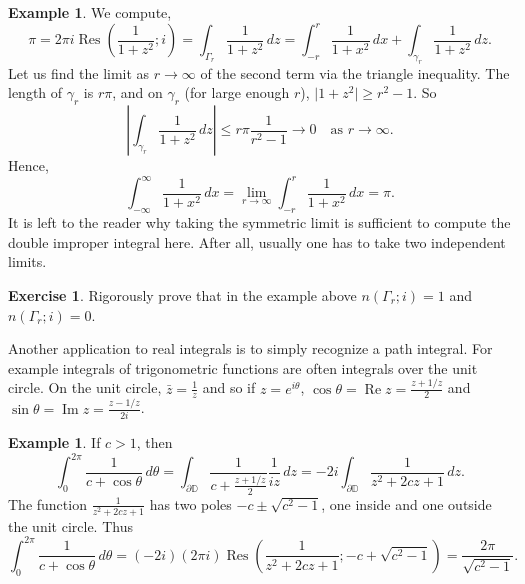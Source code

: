 \documentclass[12pt,openany]{book}
\renewcommand{\Re}{\operatorname{Re}}
\renewcommand{\Im}{\operatorname{Im}}
\newcommand{\sabs}[1]{\lvert {#1} \rvert}
\newcommand{\abs}[1]{\left\lvert {#1} \right\rvert}
\newcommand{\D}{{\mathbb{D}}}
\theoremstyle{plain}
\theoremstyle{remark}
\theoremstyle{definition}
\newenvironment{exbox}{%
    \def\FrameCommand{\vrule width 1pt \relax\hspace {10pt}}%
    \MakeFramed {\advance \hsize -\width \FrameRestore }%
}{%
    \endMakeFramed
}
\theoremstyle{exercise}
\newtheorem{exercise}{Exercise}[section]
\theoremstyle{example}
\newtheorem{example}[thm]{Example}
\begin{document}
\begin{example}
We compute,
\begin{equation*}
\pi 
=
2 \pi i \operatorname{Res}\left(\frac{1}{1+z^2};i\right) =
\int_{\Gamma_r} \frac{1}{1+z^2} \, dz
=
\int_{-r}^r \frac{1}{1+x^2} \, dx
+
\int_{\gamma_r} \frac{1}{1+z^2} \, dz .
\end{equation*}
Let us find the limit as $r \to \infty$ of the second term
via the triangle inequality.  The length of $\gamma_r$ is $r\pi$,
and on $\gamma_r$ (for large enough $r$),
$\sabs{1+z^2} \geq r^2-1$.  So
\begin{equation*}
\abs{
\int_{\gamma_r} \frac{1}{1+z^2} \, dz 
}
\leq
r \pi \frac{1}{r^2-1} \to 0 \quad \text{as } r \to \infty .
\end{equation*}
Hence,
\begin{equation*}
\int_{-\infty}^\infty
\frac{1}{1+x^2} \, dx
=
\lim_{r\to \infty} \int_{-r}^r 
\frac{1}{1+x^2} \, dx
= \pi .
\end{equation*}
It is left to the reader why taking the symmetric limit is sufficient to
compute the double improper integral here.  After all, usually one has to
take two independent limits.
\end{example}

\begin{exbox}
\begin{exercise}
Rigorously prove that in the example above
$n(\Gamma_r;i) = 1$ and
$n(\Gamma_r;i) = 0$.
\end{exercise}
\end{exbox}

Another application to real integrals is to simply recognize 
a path integral.  For example integrals of trigonometric functions
are often integrals over the unit circle.  On the unit
circle, $\bar{z} = \frac{1}{z}$ and so if $z=e^{i\theta}$,
$\cos \theta = \Re z = \frac{z+1/z}{2}$ and
$\sin \theta = \Im z = \frac{z-1/z}{2i}$.

\begin{example}
If $c > 1$, then
\begin{equation*}
\int_0^{2\pi} \frac{1}{c+\cos \theta} \, d\theta 
=
\int_{\partial \D} \frac{1}{c+\frac{z+1/z}{2}} \frac{1}{iz} \, dz
=
-2i
\int_{\partial \D} \frac{1}{z^2 + 2cz + 1} \, dz
.
\end{equation*}
The function $\frac{1}{z^2 + 2cz + 1}$ has two poles $-c \pm \sqrt{c^2-1}$,
one inside and one outside the unit circle.  Thus
\begin{equation*}
\int_0^{2\pi} \frac{1}{c+\cos \theta} \, d\theta 
=
(-2i)
(2 \pi i)
\operatorname{Res}
\left(\frac{1}{z^2 + 2cz + 1}; -c+\sqrt{c^2-1}\right)
=
\frac{2\pi}{\sqrt{c^2-1}}
.
\end{equation*}

\end{example}
\end{document}

